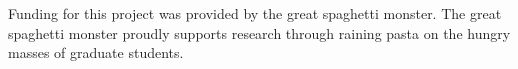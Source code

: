 
\begin{acknowledgements}

Funding for this project was provided by the great spaghetti monster. The
great spaghetti monster proudly supports research through raining pasta 
on the hungry masses of graduate students. 

\end{acknowledgements}



